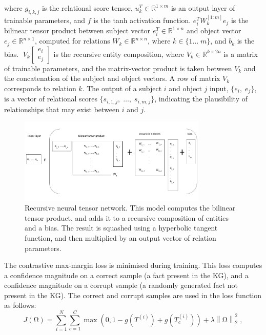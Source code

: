 \noindent where $ g_{i,k,j} $ is the relational score tensor, $ u_k^T \in \mathbb{R}^{1 \times m} $ is an output layer of trainable parameters, and $ f $ is the tanh activation function. $ e_i^TW_k^{\left [1:m \right ]} e_j $ is the bilinear tensor product between subject vector $ e_i^T \in \mathbb{R}^{1 \times n} $ and object vector $ e_j \in \mathbb{R}^{n \times 1} $, computed for relations $ W_k \in \mathbb{R}^{n \times n} $, where $ k \in \{1 \dots \; m \} $, and $ b_k $ is the bias. $ \; V_k \left [ \begin{matrix} e_i \\ e_j \end{matrix} \right ] $ is the recursive entity composition, where $ V_k \in \mathbb{R}^{k \times 2n} $ is a matrix of trainable parameters, and the matrix-vector product is taken between $ V_k $ and the concatenation of the subject and object vectors. A row of matrix $ V_k $ corresponds to relation $ k $. The output of a subject $ i $ and object $ j $ input, $ \{ e_i, \; e_j \} $, is a vector of relational scores $ \{ s_{i,1,j}, \; \dots, \; s_{i,m,j} \} $, indicating the plausibility of relationships that may exist between $ i $ and $ j $. 

\begin{figure}
   	\centering
    	\includegraphics[width=0.8\textwidth, height=0.4\textwidth]{recursive_neural_tensor_network.png}
	\captionsetup{justification=centering}
	\caption{Recursive neural tensor network. This model computes the bilinear tensor product, and adds it to a recursive composition of entities and a bias. The result is squashed using a hyperbolic tangent function, and then multiplied by an output vector of relation parameters.}
\end{figure}

\noindent The contrastive max-margin loss is minimised during training. This loss computes a confidence magnitude on a correct sample (a fact present in the KG), and a confidence magnitude on a corrupt sample (a randomly generated fact not present in the KG). The correct and corrupt samples are used in the loss function as follows:
\begin{equation}
	J(\si{\ohm}) =  \sum_{i=1}^N \sum_{c=1}^C \max(0,1 - g(T^{(i)}) + g(T_c^{(i)})) + \lambda \left \lVert \si{\ohm} \right \rVert_2^2 \; ,
\end{equation}

